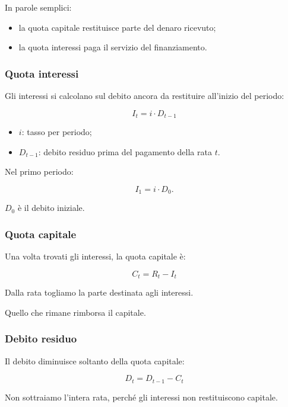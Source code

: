 \noindent In parole semplici:

\begin{itemize}
    \item la quota capitale restituisce
    parte del denaro ricevuto;

    \item la quota interessi
    paga il servizio del finanziamento.
\end{itemize}


\subsubsection*{Quota interessi}

\noindent Gli interessi si calcolano
sul debito ancora da restituire
all'inizio del periodo:

\[
\boxed{
I_t=i\cdot D_{t-1}
}
\]

\begin{itemize}
    \item $i$: tasso per periodo;
    \item $D_{t-1}$: debito residuo
    prima del pagamento della rata $t$.
\end{itemize}

\noindent Nel primo periodo:

\[
I_1=i\cdot D_0.
\]

\noindent $D_0$ è il debito iniziale.


\subsubsection*{Quota capitale}

\noindent Una volta trovati gli interessi,
la quota capitale è:

\[
\boxed{
C_t=R_t-I_t
}
\]

\noindent Dalla rata togliamo
la parte destinata agli interessi.

\noindent Quello che rimane
rimborsa il capitale.


\subsubsection*{Debito residuo}

\noindent Il debito diminuisce
soltanto della quota capitale:

\[
\boxed{
D_t=D_{t-1}-C_t
}
\]

\noindent Non sottraiamo l'intera rata,
perché gli interessi
non restituiscono capitale.

